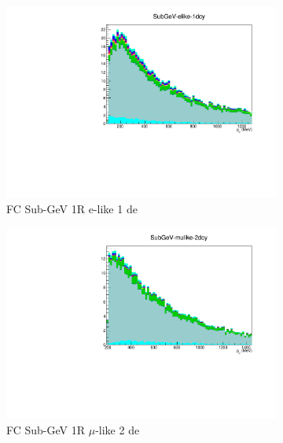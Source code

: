 \begin{figure}[ht]
    \begin{subfigure}[t]{0.49\textwidth}
    \includegraphics[width=\textwidth, trim= 0 0 0 30, clip]{Figures/Selections/AtmosphericByMode/SubGeV-elike-1dcy_LepMom.pdf}
    \caption{FC Sub-GeV 1R e-like 1 de}
    \end{subfigure}
    \begin{subfigure}[t]{0.49\textwidth}
    \includegraphics[width=\textwidth, trim= 0 0 0 30, clip]{Figures/Selections/AtmosphericByMode/SubGeV-mulike-2dcy_LepMom.pdf}
    \caption{FC Sub-GeV 1R $\mu$-like 2 de}
    \end{subfigure}
    \begin{subfigure}[t]{0.49\textwidth}

\end{subfigure}
\end{figure}
